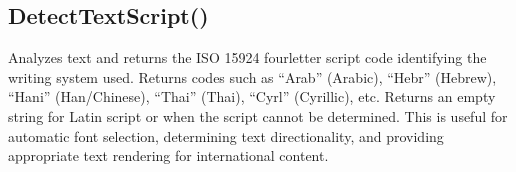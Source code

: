 \documentclass[letterpaper,10pt,english]{sphinxmanual}
\begin{document}
\sphinxAtStartPar
{}

\begin{sphinxVerbatim}[commandchars=\\\{\}]
\end{sphinxVerbatim}

\sphinxAtStartPar
{}

\begin{sphinxVerbatim}[commandchars=\\\{\}]
\end{sphinxVerbatim}

\sphinxAtStartPar
{}

\sphinxAtStartPar
{}

\ignorespaces 

\subsection{DetectTextScript()}
\label{\detokenize{reference/peblstring:detecttextscript}}\label{\detokenize{reference/peblstring:index-9}}
\sphinxAtStartPar
{}

\sphinxAtStartPar
{}

\sphinxAtStartPar
Analyzes text and returns the ISO 15924 four\sphinxhyphen{}letter script code identifying the writing system used. Returns codes such as “Arab” (Arabic), “Hebr” (Hebrew), “Hani” (Han/Chinese), “Thai” (Thai), “Cyrl” (Cyrillic), etc. Returns an empty string for Latin script or when the script cannot be determined. This is useful for automatic font selection, determining text directionality, and providing appropriate text rendering for international content.

\sphinxAtStartPar
{}

\begin{sphinxVerbatim}[commandchars=\\\{\}]
\end{sphinxVerbatim}
\end{document}
